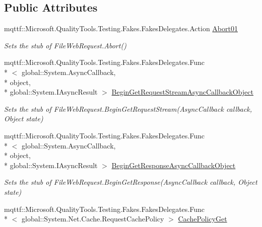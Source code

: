 \subsection*{Public Attributes}
\begin{DoxyCompactItemize}
\item 
mqttf\-::\-Microsoft.\-Quality\-Tools.\-Testing.\-Fakes.\-Fakes\-Delegates.\-Action \hyperlink{class_system_1_1_net_1_1_fakes_1_1_stub_file_web_request_a32873bdbac8bde0201c10bc1978ff83b}{Abort01}
\begin{DoxyCompactList}\small\item\em Sets the stub of File\-Web\-Request.\-Abort()\end{DoxyCompactList}\item 
mqttf\-::\-Microsoft.\-Quality\-Tools.\-Testing.\-Fakes.\-Fakes\-Delegates.\-Func\\*
$<$ global\-::\-System.\-Async\-Callback, \\*
object, \\*
global\-::\-System.\-I\-Async\-Result $>$ \hyperlink{class_system_1_1_net_1_1_fakes_1_1_stub_file_web_request_ad38af2c96d41af7e90e826a3df67cf39}{Begin\-Get\-Request\-Stream\-Async\-Callback\-Object}
\begin{DoxyCompactList}\small\item\em Sets the stub of File\-Web\-Request.\-Begin\-Get\-Request\-Stream(\-Async\-Callback callback, Object state)\end{DoxyCompactList}\item 
mqttf\-::\-Microsoft.\-Quality\-Tools.\-Testing.\-Fakes.\-Fakes\-Delegates.\-Func\\*
$<$ global\-::\-System.\-Async\-Callback, \\*
object, \\*
global\-::\-System.\-I\-Async\-Result $>$ \hyperlink{class_system_1_1_net_1_1_fakes_1_1_stub_file_web_request_a7f17f2eb6a920ec774ae695bf060777b}{Begin\-Get\-Response\-Async\-Callback\-Object}
\begin{DoxyCompactList}\small\item\em Sets the stub of File\-Web\-Request.\-Begin\-Get\-Response(\-Async\-Callback callback, Object state)\end{DoxyCompactList}\item 
mqttf\-::\-Microsoft.\-Quality\-Tools.\-Testing.\-Fakes.\-Fakes\-Delegates.\-Func\\*
$<$ global\-::\-System.\-Net.\-Cache.\-Request\-Cache\-Policy $>$ \hyperlink{class_system_1_1_net_1_1_fakes_1_1_stub_file_web_request_a9f5e5f5912c118c18fbff98a91d769fe}{Cache\-Policy\-Get}

\end{DoxyCompactItemize}

